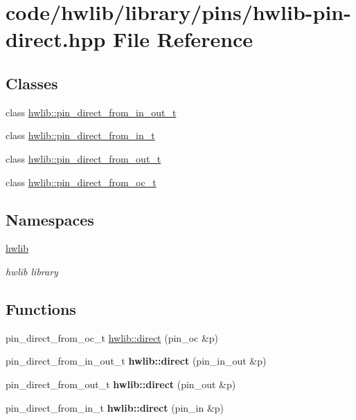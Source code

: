 \hypertarget{hwlib-pin-direct_8hpp}{}\section{code/hwlib/library/pins/hwlib-\/pin-\/direct.hpp File Reference}
\label{hwlib-pin-direct_8hpp}
\subsection*{Classes}
\begin{DoxyCompactItemize}
\item 
class \hyperlink{classhwlib_1_1pin__direct__from__in__out__t}{hwlib\+::pin\+\_\+direct\+\_\+from\+\_\+in\+\_\+out\+\_\+t}
\item 
class \hyperlink{classhwlib_1_1pin__direct__from__in__t}{hwlib\+::pin\+\_\+direct\+\_\+from\+\_\+in\+\_\+t}
\item 
class \hyperlink{classhwlib_1_1pin__direct__from__out__t}{hwlib\+::pin\+\_\+direct\+\_\+from\+\_\+out\+\_\+t}
\item 
class \hyperlink{classhwlib_1_1pin__direct__from__oc__t}{hwlib\+::pin\+\_\+direct\+\_\+from\+\_\+oc\+\_\+t}
\end{DoxyCompactItemize}
\subsection*{Namespaces}
\begin{DoxyCompactItemize}
\item 
 \hyperlink{namespacehwlib}{hwlib}
\begin{DoxyCompactList}\small\item\em hwlib library \end{DoxyCompactList}\end{DoxyCompactItemize}
\subsection*{Functions}
\textbf{ }\par
\begin{DoxyCompactItemize}
\item 
pin\+\_\+direct\+\_\+from\+\_\+oc\+\_\+t \hyperlink{namespacehwlib_a43941b7f246ad934ee43dbfa0f5c8b5a}{hwlib\+::direct} (pin\+\_\+oc \&p)
\item 
\mbox{\label{namespacehwlib_abeb61fe3ef1cbfca9053a3fa340ef6d1}} 
pin\+\_\+direct\+\_\+from\+\_\+in\+\_\+out\+\_\+t {\bfseries hwlib\+::direct} (pin\+\_\+in\+\_\+out \&p)
\item 
\mbox{\label{namespacehwlib_a5748fc71cf5509f49519ddda36994264}} 
pin\+\_\+direct\+\_\+from\+\_\+out\+\_\+t {\bfseries hwlib\+::direct} (pin\+\_\+out \&p)
\item 
\mbox{\label{namespacehwlib_afdb0cfbcc387b60d369a2ac4264c29e9}} 
pin\+\_\+direct\+\_\+from\+\_\+in\+\_\+t {\bfseries hwlib\+::direct} (pin\+\_\+in \&p)
\end{DoxyCompactItemize}

